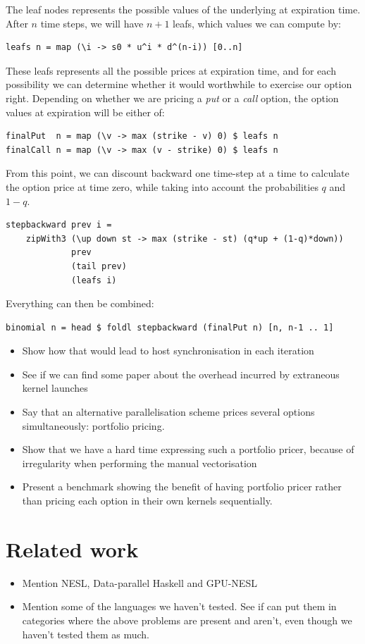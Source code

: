 \documentclass{llncs2e/llncs}
\begin{document}
The leaf nodes represents the possible values of the underlying at
expiration time. After $n$ time steps, we will have $n+1$ leafs, which
values we can compute by:
\begin{verbatim}
leafs n = map (\i -> s0 * u^i * d^(n-i)) [0..n]
\end{verbatim}
These leafs represents all the possible prices at expiration time, and
for each possibility we can determine whether it would worthwhile to
exercise our option right. Depending on whether we are pricing a
\emph{put} or a \emph{call} option, the option values at expiration
will be either of:
\begin{verbatim}
finalPut  n = map (\v -> max (strike - v) 0) $ leafs n
finalCall n = map (\v -> max (v - strike) 0) $ leafs n
\end{verbatim}
From this point, we can discount backward one time-step at a time to
calculate the option price at time zero, while taking into account the
probabilities $q$ and $1-q$.
\begin{verbatim}
stepbackward prev i =
    zipWith3 (\up down st -> max (strike - st) (q*up + (1-q)*down))
             prev
             (tail prev)
             (leafs i)
\end{verbatim}
Everything can then be combined:
\begin{verbatim}
binomial n = head $ foldl stepbackward (finalPut n) [n, n-1 .. 1]
\end{verbatim}

\begin{itemize}
\item Show how that would lead to host synchronisation in each iteration
\item See if we can find some paper about the overhead incurred by
  extraneous kernel launches
\item Say that an alternative parallelisation scheme prices several
  options simultaneously: portfolio pricing.
\item Show that we have a hard time expressing such a portfolio
  pricer, because of irregularity when performing the manual
  vectorisation
\item Present a benchmark showing the benefit of having portfolio
  pricer rather than pricing each option in their own kernels
  sequentially.
\end{itemize}

\section{Related work}
\begin{itemize}
\item Mention NESL, Data-parallel Haskell and GPU-NESL
\item Mention some of the languages we haven't tested. See if can put
  them in categories where the above problems are present and aren't,
  even though we haven't tested them as much.
\end{itemize}
\end{document}
